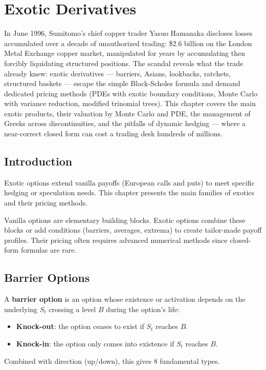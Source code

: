 \chapter{Exotic Derivatives}
\label{ch:exotic}

In June 1996, Sumitomo's chief copper trader Yasuo Hamanaka discloses losses accumulated over a decade of unauthorized trading: \$2.6 billion on the London Metal Exchange copper market, manipulated for years by accumulating then forcibly liquidating structured positions. The scandal reveals what the trade already knew: exotic derivatives --- barriers, Asians, lookbacks, ratchets, structured baskets --- escape the simple Black-Scholes formula and demand dedicated pricing methods (PDEs with exotic boundary conditions, Monte Carlo with variance reduction, modified trinomial trees). This chapter covers the main exotic products, their valuation by Monte Carlo and PDE, the management of Greeks across discontinuities, and the pitfalls of dynamic hedging --- where a near-correct closed form can cost a trading desk hundreds of millions.

\section{Introduction}

Exotic options extend vanilla payoffs (European calls
and puts) to meet specific hedging or speculation needs. This chapter presents
the main families of exotics and their pricing methods.

\begin{intuition}
Vanilla options are elementary building blocks. Exotic options combine these
blocks or add conditions (barriers, averages, extrema) to create tailor-made
payoff profiles. Their pricing often requires advanced numerical methods since
closed-form formulas are rare.
\end{intuition}

\section{Barrier Options}

\begin{definition}
A \textbf{barrier option} is an option whose existence or activation depends
on the underlying $S_t$ crossing a level $B$ during the option's life:
\begin{itemize}
    \item \textbf{Knock-out}: the option ceases to exist if $S_t$ reaches $B$.
    \item \textbf{Knock-in}: the option only comes into existence if $S_t$
    reaches $B$.
\end{itemize}
Combined with direction (up/down), this gives 8 fundamental types.
\end{definition}

